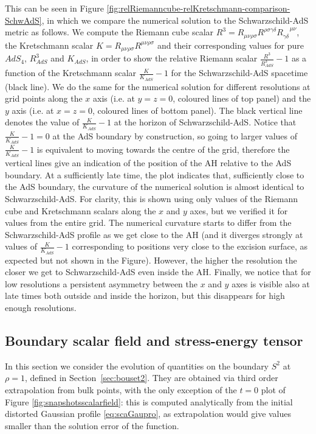 \documentclass[a4paper,11pt]{article}
\begin{document}
This can be seen in Figure \ref{fig:relRiemanncube-relKretschmann-comparison-SchwAdS}, in which we compare the numerical solution to the Schwarzschild-AdS metric as follows. We compute the Riemann cube scalar $R^3=R_{\mu\nu\rho\sigma}R^{\rho\sigma\gamma\delta}R_{\gamma\delta}^{\;\;\;\;\mu\nu}$, the Kretschmann scalar $K=R_{\mu\nu\rho\sigma}R^{\mu\nu\rho\sigma}$ and their corresponding values for pure $AdS_4$, $R^3_{AdS}$ and $K_{AdS}$, in order to show the relative Riemann scalar $\frac{R^3}{R^3_{AdS}}-1$ as a function of the Kretschmann scalar $\frac{K}{K_{AdS}}-1$ for the Schwarzschild-AdS spacetime (black line). We do the same for the numerical solution for different resolutions at grid points along the $x$ axis (i.e. at $y=z=0$, coloured lines of top panel) and the $y$ axis (i.e. at $x=z=0$, coloured lines of bottom panel). The black vertical line denotes the value of $\frac{K}{K_{AdS}}-1$ at the horizon of Schwarzschild-AdS. Notice that $\frac{K}{K_{AdS}}-1=0$ at the AdS boundary by construction, so going to larger values of $\frac{K}{K_{AdS}}-1$ is equivalent to moving towards the centre of the grid, therefore the vertical lines give an indication of the position of the AH relative to the AdS boundary.
At a sufficiently late time, the plot indicates that, sufficiently close to the AdS boundary, the curvature of the numerical solution is almost identical to Schwarzschild-AdS. For clarity, this is shown using only values of the Riemann cube and Kretschmann scalars along the $x$ and $y$ axes, but we verified it for values from the entire grid. The numerical curvature starts to differ from the Schwarzschild-AdS profile as we get close to the AH (and it diverges strongly at values of $\frac{K}{K_{AdS}}-1$ corresponding to positions very close to the excision surface, as expected but not shown in the Figure). However, the higher the resolution the closer we get to Schwarzschild-AdS even inside the AH.
Finally, we notice that for low resolutions a persistent asymmetry between the $x$ and $y$ axes is visible also at late times both outside and inside the horizon, but this disappears for high enough resolutions.


\subsection{Boundary scalar field and stress-energy tensor}
\label{sec:resbouset}

In this section we consider the evolution of quantities on the boundary $S^2$ at $\rho=1$, defined in Section~\ref{sec:bouset2}. They are obtained via third order extrapolation from bulk points, with the only exception of the $t=0$ plot of Figure \ref{fig:snapshotsscalarfield}: this is computed analytically from the initial distorted Gaussian profile \eqref{eq:scaGaupro}, as extrapolation would give values smaller than the solution error of the function. 
\end{document}
